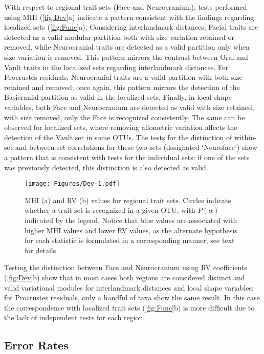 \documentclass[12pt,]{article}
\begin{document}
With respect to regional trait sets (Face and Neurocranium), tests
performed using MHI (\autoref{fig:Dev}a) indicate a pattern consistent
with the findings regarding localized sets (\autoref{fig:Func}a).
Considering interlandmark distances, Facial traits are detected as a
valid modular partition both with size variation retained or removed,
while Neurocranial traits are detected as a valid partition only when
size variation is removed. This pattern mirrors the contrast between
Oral and Vault traits in the localized sets regarding interlandmark
distances. For Procrustes residuals, Neurocranial traits are a valid
partition with both size retained and removed; once again, this pattern
mirrors the detection of the Basicranial partition as valid in the
localized sets. Finally, in local shape variables, both Face and
Neurocranium are detected as valid with size retained; with size
removed, only the Face is recognized consistently. The same can be
observed for localized sets, where removing allometric variation affects
the detection of the Vault set in some OTUs. The tests for the
distinction of within-set and between-set correlations for these two
sets (designated `Neuroface') show a pattern that is consistent with
tests for the individual sets: if one of the sets was previously
detected, this distinction is also detected as valid.

\begin{figure}[htbp]
\centering
\texttt{[image: Figures/Dev-1.pdf]}
\caption{MHI (a) and RV (b) values for regional trait sets. Circles
indicate whether a trait set is recognized in a given OTU, with
$P(\alpha)$ indicated by the legend. Notice that blue values are
associated with higher MHI values and lower RV values, as the alternate
hypothesis for each statistic is formulated in a corresponding manner;
see text for details. \label{fig:Dev}}
\end{figure}

Testing the distinction between Face and Neurocranium using RV
coefficients (\autoref{fig:Dev}b) show that in most cases both regions
are considered distinct and valid variational modules for interlandmark
distances and local shape variables; for Procrustes residuals, only a
handful of taxa show the same result. In this case the correspondence
with localized trait sets (\autoref{fig:Func}b) is more difficult due to
the lack of independent tests for each region.

\subsection{Error Rates}\label{error-rates}
\end{document}
